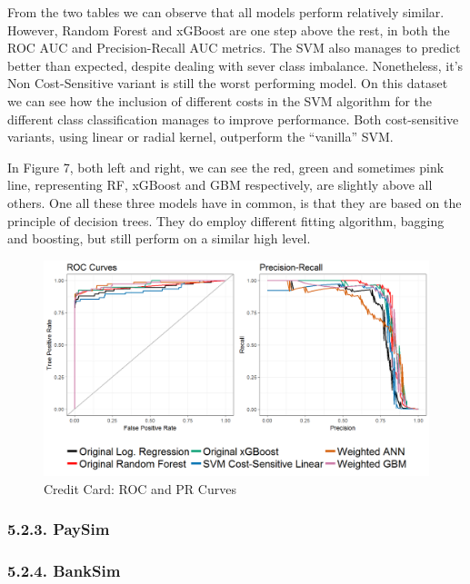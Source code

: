 \documentclass[12pt,]{article}
\begin{document}
From the two tables we can observe that all models perform relatively
similar. However, Random Forest and xGBoost are one step above the rest,
in both the ROC AUC and Precision-Recall AUC metrics. The SVM also
manages to predict better than expected, despite dealing with sever
class imbalance. Nonetheless, it's Non Cost-Sensitive variant is still
the worst performing model. On this dataset we can see how the inclusion
of different costs in the SVM algorithm for the different class
classification manages to improve performance. Both cost-sensitive
variants, using linear or radial kernel, outperform the ``vanilla'' SVM.

In Figure 7, both left and right, we can see the red, green and
sometimes pink line, representing RF, xGBoost and GBM respectively, are
slightly above all others. One all these three models have in common, is
that they are based on the principle of decision trees. They do employ
different fitting algorithm, bagging and boosting, but still perform on
a similar high level.

\begin{figure}
\centering
\includegraphics[width=1\textwidth,height=\textheight]{figures/credit/cr_card_roc_pr.png}
\caption{Credit Card: ROC and PR Curves}
\end{figure}

\hypertarget{paysim-1}{%
\subsubsection{5.2.3. PaySim}\label{paysim-1}}

\hypertarget{banksim-1}{%
\subsubsection{5.2.4. BankSim}\label{banksim-1}}
\end{document}
